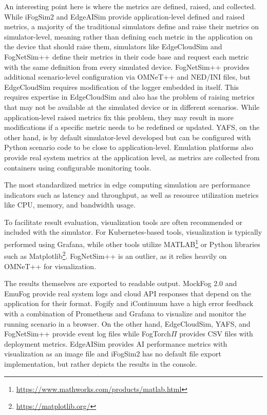 An interesting point here is where the metrics are defined, raised, and collected.
While iFogSim2 and EdgeAISim provide application-level defined and raised metrics, a majority of the traditional simulators define and raise their metrics on simulator-level, meaning rather than defining each metric in the application on the device that should raise them, simulators 
like EdgeCloudSim and FogNetSim++ define their metrics in their code base and request each metric with the same definition from every simulated device.
FogNetSim++ provides additional scenario-level configuration via OMNeT++ and NED/INI files, but EdgeCloudSim requires modification of the logger embedded in itself.
This requires expertise in EdgeCloudSim and also has the problem of raising metrics that may not be available at the simulated device or in different scenarios.
While application-level raised metrics fix this problem, they may result in more modifications if a specific metric needs to be redefined or updated.
YAFS, on the other hand, is by default simulator-level developed but can be configured with Python scenario code to be close to application-level.
Emulation platforms also provide real system metrics at the application level, as metrics are collected from containers using configurable monitoring tools.

The most standardized metrics in edge computing simulation are performance indicators such as latency and throughput, as well as resource utilization metrics like CPU, memory, and bandwidth usage.

To facilitate result evaluation, visualization tools are often recommended or included with the simulator.
For Kubernetes-based tools, visualization is typically performed using Grafana, while other tools utilize MATLAB\footnote{\url{https://www.mathworks.com/products/matlab.html}} or Python libraries such as Matplotlib\footnote{\url{https://matplotlib.org/}}.
FogNetSim++ is an outlier, as it relies heavily on OMNeT++ for visualization.

The results themselves are exported to readable output.
MockFog 2.0 and EmuFog provide real system logs and cloud API responses that depend on the application for their format.
Fogify and iContinuum have a high error feedback with a combination of Prometheus and Grafana to visualize and monitor the running scenario in a browser.
On the other hand, EdgeCloudSim, YAFS, and FogNetSim++ provide event log files while FogTorch$\Pi$ provides CSV files with deployment metrics.
EdgeAISim provides AI performance metrics with visualization as an image file and iFogSim2 has no default file export implementation, but rather depicts the results in the console.

